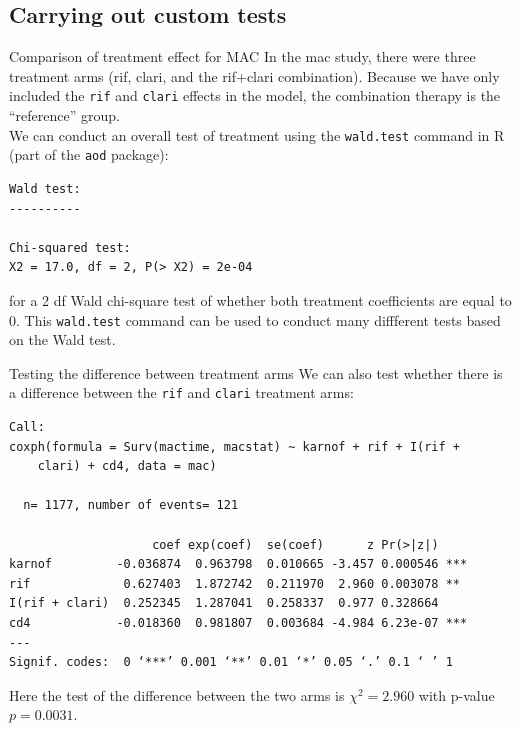 \documentclass[envcountsect, 10pt, portrait, palatino]{beamer}
\begin{document}
\subsection{Carrying out custom tests}
\begin{frame}[fragile]{Comparison of treatment effect for MAC}
In the mac study, there were three treatment arms (rif,
clari, and the rif+clari combination).  Because we have only included
the {\tt rif} and {\tt clari} effects in the model, the combination
therapy is the ``reference'' group.
\\[2ex]
We can conduct an overall test of treatment using the {\tt wald.test}
command in R (part of the {\tt aod} package):

\small
\begin{verbatim}
Wald test:
----------

Chi-squared test:
X2 = 17.0, df = 2, P(> X2) = 2e-04
\end{verbatim}
\normalsize
for a 2 df Wald chi-square test of whether both treatment
coefficients are equal to 0.  This {\tt wald.test} command can
be used to conduct many diffferent tests based on the Wald test.
\end{frame}
\begin{frame}[fragile]{Testing the difference between treatment arms}
We can also test whether there is
a difference between the {\tt rif} and {\tt clari} treatment arms:

\scriptsize
\begin{verbatim}
Call:
coxph(formula = Surv(mactime, macstat) ~ karnof + rif + I(rif +
    clari) + cd4, data = mac)

  n= 1177, number of events= 121

                    coef exp(coef)  se(coef)      z Pr(>|z|)
karnof         -0.036874  0.963798  0.010665 -3.457 0.000546 ***
rif             0.627403  1.872742  0.211970  2.960 0.003078 **
I(rif + clari)  0.252345  1.287041  0.258337  0.977 0.328664
cd4            -0.018360  0.981807  0.003684 -4.984 6.23e-07 ***
---
Signif. codes:  0 ‘***’ 0.001 ‘**’ 0.01 ‘*’ 0.05 ‘.’ 0.1 ‘ ’ 1
\end{verbatim}
\normalsize
Here the test of the difference between the two arms is $\chi^2=2.960$ with p-value $p=0.0031$.
\end{frame}
\end{document}
